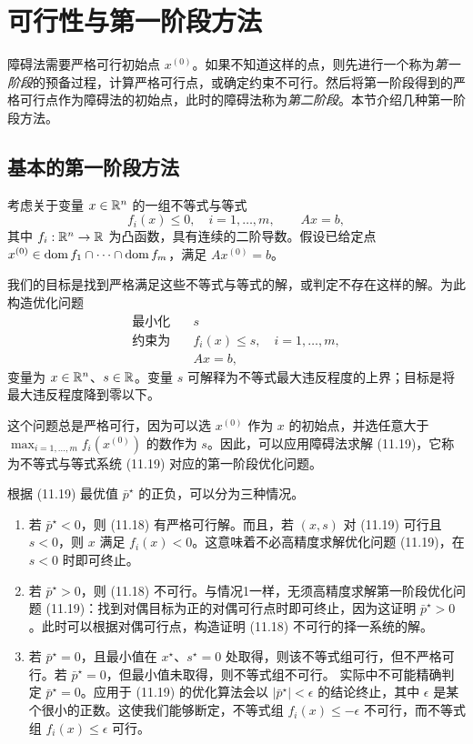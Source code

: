 \section{可行性与第一阶段方法}
障碍法需要严格可行初始点 $x^{(0)}$。如果不知道这样的点，则先进行一个称为\emph{第一阶段}的预备过程，计算严格可行点，或确定约束不可行。然后将第一阶段得到的严格可行点作为障碍法的初始点，此时的障碍法称为\emph{第二阶段}。本节介绍几种第一阶段方法。

\subsection{基本的第一阶段方法}
考虑关于变量 $x\in\mathbb R^n$ 的一组不等式与等式
\begin{equation}
f_i(x)\le0,\quad i=1,\ldots,m,\qquad Ax=b,\tag{11.18}
\end{equation}
其中 $f_i:\mathbb R^n\to\mathbb R$ 为凸函数，具有连续的二阶导数。假设已给定点 $x^{(0)}\in\operatorname{dom} f_1\cap\cdots\cap\operatorname{dom} f_m$，满足 $Ax^{(0)}=b$。

我们的目标是找到严格满足这些不等式与等式的解，或判定不存在这样的解。为此构造优化问题
\begin{equation}\begin{aligned}
\text{最小化}\quad&s\\
\text{约束为}\quad&f_i(x)\le s,\quad i=1,\ldots,m,\\
&Ax=b,
\end{aligned}\tag{11.19}\end{equation}
变量为 $x\in\mathbb R^n$、$s\in\mathbb R$。变量 $s$ 可解释为不等式最大违反程度的上界；目标是将最大违反程度降到零以下。

这个问题总是严格可行，因为可以选 $x^{(0)}$ 作为 $x$ 的初始点，并选任意大于 $\max_{i=1,\ldots,m}f_i(x^{(0)})$ 的数作为 $s$。因此，可以应用障碍法求解 (11.19)，它称为不等式与等式系统 (11.19) 对应的第一阶段优化问题。

根据 (11.19) 最优值 $\bar p^\star$ 的正负，可以分为三种情况。
\begin{enumerate}
\item 若 $\bar p^\star<0$，则 (11.18) 有严格可行解。而且，若 $(x,s)$ 对 (11.19) 可行且 $s<0$，则 $x$ 满足 $f_i(x)<0$。这意味着不必高精度求解优化问题 (11.19)，在 $s<0$ 时即可终止。
\item 若 $\bar p^\star>0$，则 (11.18) 不可行。与情况1一样，无须高精度求解第一阶段优化问题 (11.19)：找到对偶目标为正的对偶可行点时即可终止，因为这证明 $\bar p^\star>0$。此时可以根据对偶可行点，构造证明 (11.18) 不可行的择一系统的解。
\item 若 $\bar p^\star=0$，且最小值在 $x^\star$、$s^\star=0$ 处取得，则该不等式组可行，但不严格可行。若 $\bar p^\star=0$，但最小值未取得，则不等式组不可行。
实际中不可能精确判定 $\bar p^\star=0$。应用于 (11.19) 的优化算法会以 $|\bar p^\star|<\epsilon$ 的结论终止，其中 $\epsilon$ 是某个很小的正数。这使我们能够断定，不等式组 $f_i(x)\le-\epsilon$ 不可行，而不等式组 $f_i(x)\le\epsilon$ 可行。
\end{enumerate}

